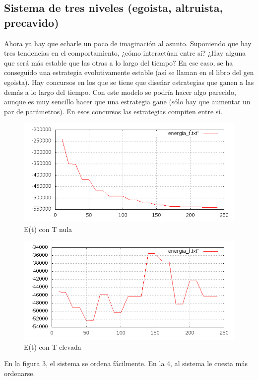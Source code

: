 \documentclass[a4paper,10pt,twocolumn]{article}
\begin{document}
\subsection*{Sistema de tres niveles (egoista, altruista, precavido)}

Ahora ya hay que echarle un poco de imaginaci\'on al asunto. Suponiendo que hay tres tendencias en el comportamiento, ¿c\'omo interact\'uan entre s\'i? ¿Hay alguna que ser\'a m\'as estable que las otras a lo largo del tiempo? En ese caso, se ha conseguido una estrategia evolutivamente estable (as\'i se llaman en el libro del gen egoista). Hay concursos en los que se tiene que dise\'nar estrategias que ganen a las dem\'as a lo largo del tiempo. Con este modelo se podr\'ia hacer algo parecido, aunque es muy sencillo hacer que una estrategia gane (s\'olo hay que aumentar un par de par\'ametros). En esos concursos las estrategias compiten entre s\'i.
\begin{figure}
\includegraphics[scale=.4]{E-0-1-0-precavido.png}
\caption{E(t) con T nula}
\end{figure}
\begin{figure}
\includegraphics[scale=.4]{E-10000-1-0-precavido.png}
\caption{E(t) con T elevada}
\end{figure}

En la figura 3, el sistema se ordena f\'acilmente. En la 4, al sistema le cuesta m\'as ordenarse.
\end{document}
